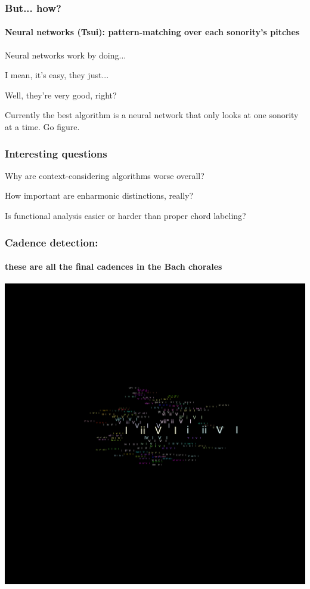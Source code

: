 \documentclass{beamer}
\begin{document}
\begin{frame}
  \frametitle{But... how?}
  \framesubtitle{Neural networks (Tsui): pattern-matching over each sonority's
  pitches}

Neural networks work by doing...

I mean, it's easy, they just...

Well, they're very good, right?

\addvspace{2em}
\begin{small}
  Currently the best algorithm is a neural network that only looks at
  one sonority at a time. Go figure.
\end{small}
\end{frame}

\begin{frame}
  \frametitle{Interesting questions}
  Why are context-considering algorithms worse overall?
  
  \addvspace{2em}

  How important are enharmonic distinctions, really?

  \addvspace{2em}
  
  Is functional analysis easier or harder than proper chord labeling?
\end{frame}

\begin{frame}
  \frametitle{Cadence detection:}
  \framesubtitle{these are all the final cadences in the Bach chorales}
  \centering
  \addvspace{0.5em}
  \includegraphics[scale=0.3, trim = 50em 0em 0em 50em, clip]{figs/cadences}
\end{frame}
\end{document}
